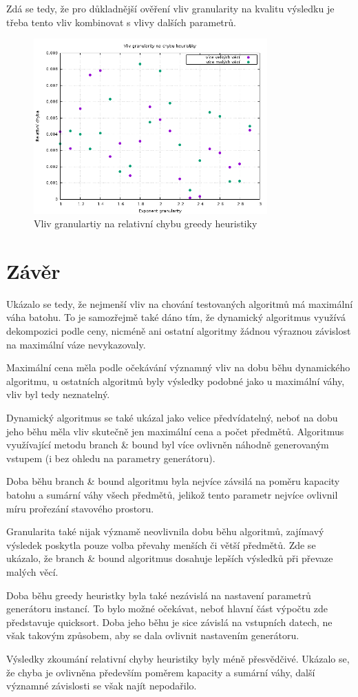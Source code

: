 \documentclass[11pt]{article}
\begin{document}
Zdá se tedy, že pro důkladnější ověření vliv granularity na kvalitu výsledku je třeba tento vliv kombinovat s vlivy dalších parametrů.

\begin{figure}[h!]
	\centering
    	\includegraphics[width=0.8\textwidth]{../data/gerror.png}
	\caption{Vliv granulartiy na relativní chybu greedy heuristiky}
	\label{fig:gerror}
\end{figure}

\section{Závěr}

Ukázalo se tedy, že nejmenší vliv na chování testovaných algoritmů má maximální váha batohu. To je samozřejmě také dáno tím, že dynamický algoritmus využívá dekompozici podle ceny, nicméně ani ostatní algoritmy žádnou výraznou závislost na maximální váze nevykazovaly.

Maximální cena měla podle očekávání významný vliv na dobu běhu dynamického algoritmu, u ostatních algoritmů byly výsledky podobné jako u maximální váhy, vliv byl tedy neznatelný.

Dynamický algoritmus se také ukázal jako velice předvídatelný, neboť na dobu jeho běhu měla vliv skutečně jen maximální cena a počet předmětů. Algoritmus využívající metodu branch \& bound byl více ovlivněn náhodně generovaným vstupem (i bez ohledu na parametry generátoru).

Doba běhu branch \& bound algoritmu byla nejvíce závsilá na poměru kapacity batohu a sumární váhy všech předmětů, jelikož tento parametr nejvíce ovlivnil míru prořezání stavového prostoru.

Granularita také nijak významě neovlivnila dobu běhu algoritmů, zajímavý výsledek poskytla pouze volba převahy menších či větší předmětů. Zde se ukázalo, že branch \& bound algoritmus dosahuje lepších výsledků při převaze malých věcí.

Doba běhu greedy heuristky byla také nezávislá na nastavení parametrů generátoru instancí. To bylo možné očekávat, neboť hlavní část výpočtu zde představuje quicksort. Doba jeho běhu je sice závislá na vstupních datech, ne však takovým způsobem, aby se dala ovlivnit nastavením generátoru.

Výsledky zkoumání relativní chyby heuristiky byly méně přesvědčivé. Ukázalo se, že chyba je ovlivněna především poměrem kapacity a sumární váhy, další významné závislosti se však najít nepodařilo.
\end{document}
